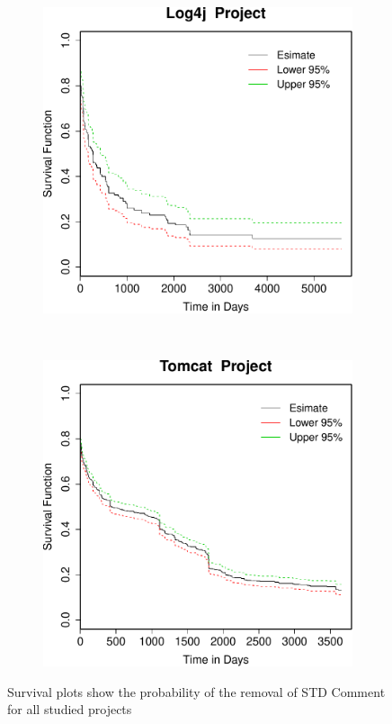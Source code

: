 \begin{figure}[t]
	
	\begin{subfigure}[b]{0.31\textwidth}
		\includegraphics[width=\textwidth]{figures/Survival/log4j.pdf}
	\end{subfigure}
	~
	~
	\begin{subfigure}[b]{0.31\textwidth}
		\includegraphics[width=\textwidth]{figures/Survival/tomcat.pdf}
	\end{subfigure}
	\caption{Survival plots show the probability of the removal of STD Comment for all studied projects}
	\label{fig:survival_plots}
\end{figure}

